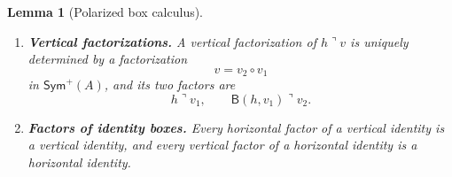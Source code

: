 \documentclass[oneside]{article}
\newcommand{\Sym}{\mathsf{Sym}}
\newcommand{\trcorner}{\mathbin{\urcorner}}
\newcommand{\bottomedge}[2]{\mathsf{B}(#1,#2)}
\theoremstyle{plain}
\newtheorem{lemma}[theorem]{Lemma}
\theoremstyle{definition}
\theoremstyle{remark}
\begin{document}
\begin{lemma}[Polarized box calculus]
\begin{enumerate}
        \item \textbf{Vertical factorizations.} A vertical factorization of \(h\trcorner v\) is uniquely determined by a factorization
        \[
            v=v_2\circ v_1
        \]
        in \(\Sym^+(A)\), and its two factors are
        \begin{equation}
            h\trcorner v_1,
            \qquad
            \bottomedge{h}{v_1}\trcorner v_2.
            \label{eq:cgqg-vacant-cell-vertical-factorization}
        \end{equation}

        \item \textbf{Factors of identity boxes.} Every horizontal factor of a vertical identity is a vertical identity, and every vertical factor of a horizontal identity is a horizontal identity.
    \end{enumerate}
\end{lemma}
\end{document}
